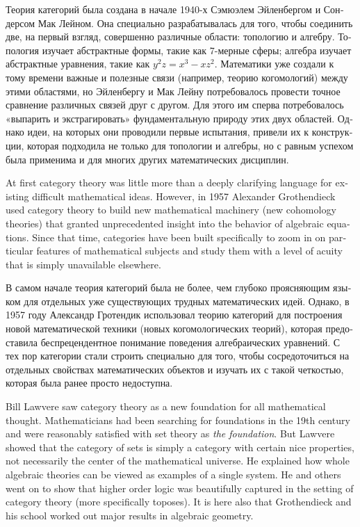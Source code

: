 \documentclass[a4paper]{book}
\theoremstyle{myth}
\begin{document}
\begin{english}
\begin{russian}Теория категорий была создана в начале 1940-х Сэмюэлем Эйленбергом и Сондерсом Мак Лейном. Она специально разрабатывалась для того, чтобы соединить две, на первый взгляд, совершенно различные области: топологию и алгебру. Топология изучает абстрактные формы, такие как 7-мерные сферы; алгебра изучает абстрактные уравнения, такие как $y^2z=x^3-xz^2$. Математики уже создали к тому времени важные и полезные связи (например, теорию когомологий) между этими областями, но Эйленбергу и Мак Лейну потребовалось провести точное сравнение различных связей друг с другом. Для этого им сперва потребовалось «выпарить и экстрагировать» фундаментальную природу этих двух областей. Однако идеи, на которых они проводили первые испытания, привели их к конструкции, которая подходила не только для топологии и алгебры, но с равным успехом была применима и для многих других математических дисциплин. \end{russian}

At first category theory was little more than a deeply clarifying language for existing difficult mathematical ideas. However, in 1957 Alexander Grothendieck used category theory to build new mathematical machinery (new cohomology theories) that granted unprecedented insight into the behavior of algebraic equations. Since that time, categories have been built specifically to zoom in on particular features of mathematical subjects and study them with a level of acuity that is simply unavailable elsewhere.

\begin{russian}В самом начале теория категорий была не более, чем глубоко проясняющим языком для отдельных уже существующих трудных математических идей. Однако, в 1957 году Александр Гротендик использовал теорию категорий для построения новой математической техники (новых когомологических теорий), которая предоставила беспрецендентное понимание поведения алгебраических уравнений. С тех пор категории стали строить специально для того, чтобы сосредоточиться на отдельных свойствах математических объектов и изучать их с такой четкостью, которая была ранее просто недоступна. \end{russian}

Bill Lawvere saw category theory as a new foundation for all mathematical thought. Mathematicians had been searching for foundations in the 19th century and were reasonably satisfied with set theory as {\em the foundation}. But Lawvere showed that the category of sets is simply a category with certain nice properties, not necessarily the center of the mathematical universe. He explained how whole algebraic theories can be viewed as examples of a single system. He and others went on to show that higher order logic was beautifully captured in the setting of category theory (more specifically toposes). It is here also that Grothendieck and his school worked out major results in algebraic geometry.


\end{english}
\end{document}
